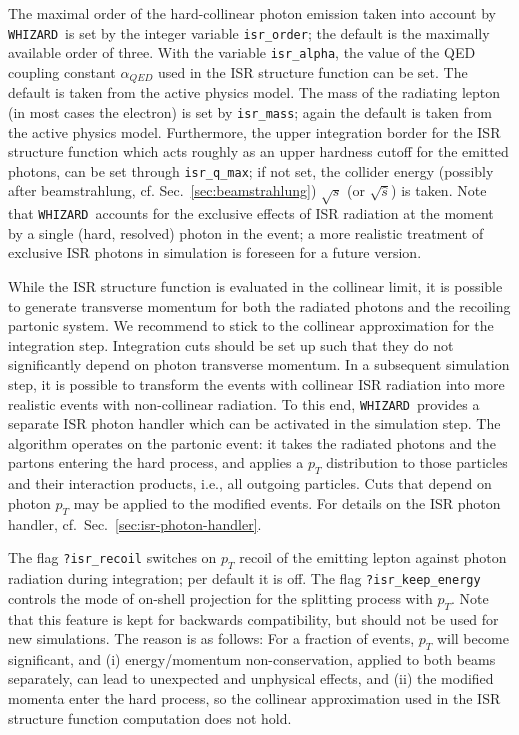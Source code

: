 \documentclass[12pt]{book}
\newcommand{\ttt}[1]{\texttt{#1}}
\newcommand{\whizard}{\ttt{WHIZARD}}
\begin{document}
The maximal order of the hard-collinear photon emission taken into
account by \whizard\ is set by the integer variable \ttt{isr\_order};
the default is the maximally available order of three. With the
variable \ttt{isr\_alpha}, the value of the QED coupling constant
$\alpha_{QED}$ used in the ISR structure function can be set. The
default is taken from the active physics model. The mass of the
radiating lepton (in most cases the electron) is set by
\ttt{isr\_mass}; again the default is taken from the active physics
model. Furthermore, the upper integration border for the ISR structure
function which acts roughly as an upper hardness cutoff for the emitted
photons, can be set through \ttt{isr\_q\_max}; if not set, the
collider energy (possibly after beamstrahlung,
cf. Sec.~\ref{sec:beamstrahlung}) $\sqrt{s}$ (or $\sqrt{\widehat{s}}$)
is taken.  Note that \whizard\ accounts for the
exclusive effects of ISR radiation at the moment by a single (hard,
resolved) photon in the event; a more realistic treatment of exclusive
ISR photons in simulation is foreseen for a future version.

While the ISR structure function is evaluated in the collinear limit,
it is possible to generate transverse momentum for both the radiated
photons and the recoiling partonic system.  We recommend to stick to
the collinear approximation for the integration step.  Integration
cuts should be set up such that they do not significantly depend on
photon transverse momentum.  In a subsequent simulation step, it is
possible to transform the events with collinear ISR radiation into
more realistic events with non-collinear radiation.  To this end,
\whizard\ provides a separate ISR photon handler which can be
activated in the simulation step.  The algorithm operates on the
partonic event: it takes the radiated photons and the partons entering
the hard process, and applies a $p_T$ distribution to those particles
and their interaction products, i.e., all outgoing particles.  Cuts
that depend on photon $p_T$ may be applied to the modified events.
For details on the ISR photon handler,
cf.\ Sec.~\ref{sec:isr-photon-handler}.

{\footnotesize The flag \ttt{?isr\_recoil} switches on $p_T$ recoil of
  the emitting lepton against photon radiation during integration; per
  default it is off.  The flag \ttt{?isr\_keep\_energy} controls the
  mode of on-shell projection for the splitting process with $p_T$.
  Note that this feature is kept for backwards compatibility, but
  should not be used for new simulations.  The reason is as follows:
  For a fraction of events, $p_T$ will become significant, and (i)
  energy/momentum non-conservation, applied to both beams separately,
  can lead to unexpected and unphysical effects, and (ii) the modified
  momenta enter the hard process, so the collinear approximation used
  in the ISR structure function computation does not hold.  }
\end{document}
